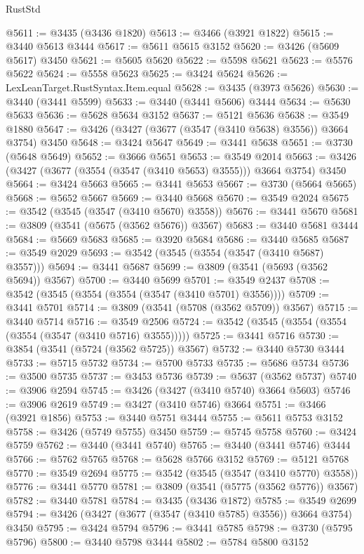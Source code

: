 \begin{lexlean}{RustStd}
\begin{coremodule}
@5611 := @3435 (@3436 @1820)
@5613 := @3466 (@3921 @1822)
@5615 := @3440 @5613 @3444
@5617 := @5611 @5615 @3152
@5620 := @3426 (@5609 @5617) @3450
@5621 := @5605 @5620
@5622 := @5598 @5621
@5623 := @5576 @5622
@5624 := @5558 @5623
@5625 := @3424 @5624
@5626 := LexLeanTarget.RustSyntax.Item.equal
@5628 := @3435 (@3973 @5626)
@5630 := @3440 (@3441 @5599)
@5633 := @3440 (@3441 @5606) @3444
@5634 := @5630 @5633
@5636 := @5628 @5634 @3152
@5637 := @5121 @5636
@5638 := @3549 @1880
@5647 := @3426 (@3427 (@3677 (@3547 (@3410 @5638) @3556)) @3664 @3754) @3450
@5648 := @3424 @5647
@5649 := @3441 @5638
@5651 := @3730 (@5648 @5649)
@5652 := @3666 @5651
@5653 := @3549 @2014
@5663 := @3426 (@3427 (@3677 (@3554 (@3547 (@3410 @5653) @3555))) @3664 @3754) @3450
@5664 := @3424 @5663
@5665 := @3441 @5653
@5667 := @3730 (@5664 @5665)
@5668 := @5652 @5667
@5669 := @3440 @5668
@5670 := @3549 @2024
@5675 := @3542 (@3545 (@3547 (@3410 @5670) @3558))
@5676 := @3441 @5670
@5681 := @3809 (@3541 (@5675 (@3562 @5676)) @3567)
@5683 := @3440 @5681 @3444
@5684 := @5669 @5683
@5685 := @3920 @5684
@5686 := @3440 @5685
@5687 := @3549 @2029
@5693 := @3542 (@3545 (@3554 (@3547 (@3410 @5687) @3557)))
@5694 := @3441 @5687
@5699 := @3809 (@3541 (@5693 (@3562 @5694)) @3567)
@5700 := @3440 @5699
@5701 := @3549 @2437
@5708 := @3542 (@3545 (@3554 (@3554 (@3547 (@3410 @5701) @3556))))
@5709 := @3441 @5701
@5714 := @3809 (@3541 (@5708 (@3562 @5709)) @3567)
@5715 := @3440 @5714
@5716 := @3549 @2506
@5724 := @3542 (@3545 (@3554 (@3554 (@3554 (@3547 (@3410 @5716) @3555)))))
@5725 := @3441 @5716
@5730 := @3854 (@3541 (@5724 (@3562 @5725)) @3567)
@5732 := @3440 @5730 @3444
@5733 := @5715 @5732
@5734 := @5700 @5733
@5735 := @5686 @5734
@5736 := @3500 @5735
@5737 := @3453 @5736
@5739 := @5637 (@3562 @5737)
@5740 := @3906 @2594
@5745 := @3426 (@3427 (@3410 @5740) @3664 @5603)
@5746 := @3906 @2619
@5749 := @3427 (@3410 @5746) @3664
@5751 := @3466 (@3921 @1856)
@5753 := @3440 @5751 @3444
@5755 := @5611 @5753 @3152
@5758 := @3426 (@5749 @5755) @3450
@5759 := @5745 @5758
@5760 := @3424 @5759
@5762 := @3440 (@3441 @5740)
@5765 := @3440 (@3441 @5746) @3444
@5766 := @5762 @5765
@5768 := @5628 @5766 @3152
@5769 := @5121 @5768
@5770 := @3549 @2694
@5775 := @3542 (@3545 (@3547 (@3410 @5770) @3558))
@5776 := @3441 @5770
@5781 := @3809 (@3541 (@5775 (@3562 @5776)) @3567)
@5782 := @3440 @5781
@5784 := @3435 (@3436 @1872)
@5785 := @3549 @2699
@5794 := @3426 (@3427 (@3677 (@3547 (@3410 @5785) @3556)) @3664 @3754) @3450
@5795 := @3424 @5794
@5796 := @3441 @5785
@5798 := @3730 (@5795 @5796)
@5800 := @3440 @5798 @3444
@5802 := @5784 @5800 @3152

\end{coremodule}
\end{lexlean}
